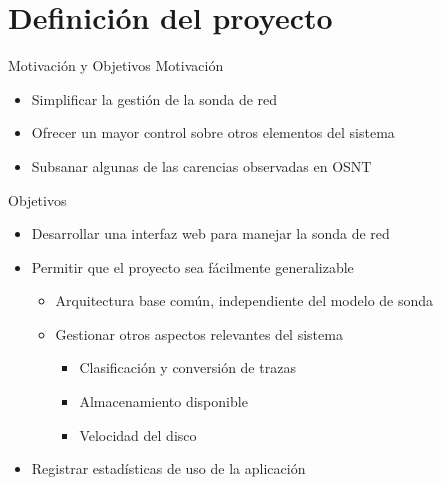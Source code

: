 \section{Definición del proyecto}

\begin{frame}{Motivación y Objetivos}
  Motivación
  \begin{itemize}
    \item Simplificar la gestión de la sonda de red
    \item Ofrecer un mayor control sobre otros elementos del sistema
    \item Subsanar algunas de las carencias observadas en OSNT
  \end{itemize}
  Objetivos
  \begin{itemize}
    \item Desarrollar una interfaz web para manejar la sonda de red
    \item Permitir que el proyecto sea fácilmente generalizable
    \begin{itemize}
      \item Arquitectura base común, independiente del modelo de sonda
      \item Gestionar otros aspectos relevantes del sistema
      \begin{itemize}
        \item Clasificación y conversión de trazas
        \item Almacenamiento disponible
        \item Velocidad del disco
      \end{itemize}
    \end{itemize}
    \item Registrar estadísticas de uso de la aplicación
  \end{itemize}
\end{frame}
